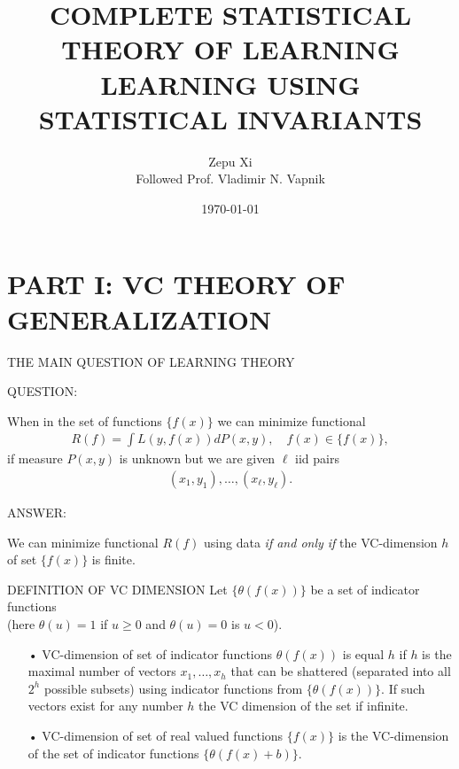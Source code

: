 \documentclass[11pt]{beamer}
\author{Zepu Xi\\Followed Prof. Vladimir N. Vapnik}
\title{COMPLETE STATISTICAL THEORY OF LEARNING\\LEARNING USING STATISTICAL INVARIANTS}
\institute{Sun Yat-sen University}
\date{\today}
\begin{document}
\begin{frame}
\titlepage
\end{frame}


\section{PART I: VC THEORY OF GENERALIZATION}
\begin{frame}
{\color{blue}{
\begin{center}
PART I
\end{center}
\begin{center}
VC THEORY OF GENERALIZATION
\end{center}
}}
\end{frame}


\begin{frame}{THE MAIN QUESTION OF LEARNING THEORY}
\begin{center}
QUESTION:

When in the set of functions $\{f(x)\}$ we can minimize functional
\begin{align*}
R(f) = \int L(y, f(x))dP(x,y), \quad f(x) \in \{f(x)\},
\end{align*}
if measure $P(x,y)$ is unknown but we are given $\ell$ iid pairs
\begin{align*}
(x_{1}, y_{1}), \ldots, (x_{\ell}, y_{\ell}).
\end{align*}

ANSWER:

We can minimize functional $R(f)$ using data \emph{if and only if} the VC-dimension $h$ of set $\{f(x)\}$ is finite. 
\end{center}
\end{frame}


\begin{frame}{DEFINITION OF VC DIMENSION}
Let $\{\theta(f(x))\}$ be a set of indicator functions \\(here $\theta(u) = 1$ if $u \geq 0$ and $\theta(u) = 0$ is $u < 0$).

\begin{enumerate}
\item[•] VC-dimension of set of indicator functions $\theta(f(x))$ is equal $h$ if $h$ is the maximal number of vectors $x_{1}, \ldots, x_{h}$ that can be shattered (separated into all $2^{h}$ possible subsets) using indicator functions from $\{\theta(f(x))\}$. If such vectors exist for any number $h$ the VC dimension of the set if infinite.
\item[•] VC-dimension of set of real valued functions $\{f(x)\}$ is the VC-dimension of the set of indicator functions $\{\theta(f(x)+b)\}$.
\end{enumerate}
\end{frame}
\end{document}
